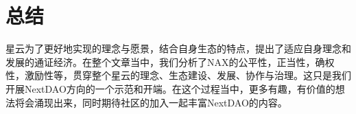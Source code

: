 \section{总结}
星云为了更好地实现的理念与愿景，结合自身生态的特点，提出了适应自身理念和发展的通证经济。在整个文章当中，我们分析了NAX的公平性，正当性，确权性，激励性等，贯穿整个星云的理念、生态建设、发展、协作与治理。这只是我们开展NextDAO方向的一个示范和开端。在这个过程当中，更多有趣，有价值的想法将会涌现出来，同时期待社区的加入一起丰富NextDAO的内容。

